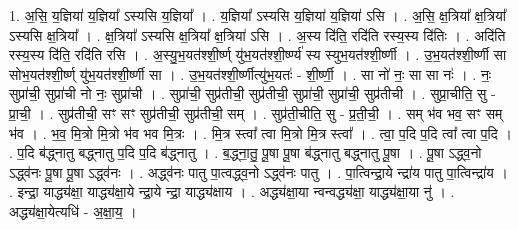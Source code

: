 \documentclass[17pt]{extarticle}
\begin{document}
1. अ॒सि॒ य॒ज्ञिया॑ य॒ज्ञिया᳚ ऽस्यसि य॒ज्ञिया᳚ । . य॒ज्ञिया᳚ ऽस्यसि य॒ज्ञिया॑ य॒ज्ञिया॑ ऽसि । . अ॒सि॒ क्ष॒त्रिया᳚ क्ष॒त्रिया᳚ ऽस्यसि क्ष॒त्रिया᳚ । . क्ष॒त्रिया᳚ ऽस्यसि क्ष॒त्रिया᳚ क्ष॒त्रिया॑ ऽसि । . अ॒स्य दि॑ति॒ रदि॑ति रस्य॒स्य दि॑तिः । . अदि॑ति रस्य॒स्य दि॑ति॒ रदि॑ति रसि । . अ॒स्यु॒भ॒यत॑श्शी॒र्ष्ण् यु॑भ॒यत॑श्शी॒र्ष्ण्य॑ स्य स्युभ॒यत॑श्शी॒र्ष्णी । . उ॒भ॒यत॑श्शी॒र्ष्णी सा सोभ॒यत॑श्शी॒र्ष्ण् यु॑भ॒यत॑श्शी॒र्ष्णी सा । . उ॒भ॒यत॑श्शी॒र्ष्णीत्यु॑भ॒यतः॑ - शी॒र्ष्णी॒ । . सा नो॑ नः॒ सा सा नः॑ । . नः॒ सुप्रा॑ची॒ सुप्रा॑ची नो नः॒ सुप्रा॑ची । . सुप्रा॑ची॒ सुप्र॑तीची॒ सुप्र॑तीची॒ सुप्रा॑ची॒ सुप्रा॑ची॒ सुप्र॑तीची । . सुप्रा॒चीति॒ सु - प्रा॒ची॒ । . सुप्र॑तीची॒ सꣳ सꣳ सुप्र॑तीची॒ सुप्र॑तीची॒ सम् । . सुप्र॑ती॒चीति॒ सु - प्र॒ती॒ची॒ । . सम् भ॑व भव॒ सꣳ सम् भ॑व । . भ॒व॒ मि॒त्रो मि॒त्रो भ॑व भव मि॒त्रः । . मि॒त्र स्त्वा᳚ त्वा मि॒त्रो मि॒त्र स्त्वा᳚ । . त्वा॒ प॒दि प॒दि त्वा᳚ त्वा प॒दि । . प॒दि ब॑द्ध्नातु बद्ध्नातु प॒दि प॒दि ब॑द्ध्नातु । . ब॒द्ध्ना॒तु॒ पू॒षा पू॒षा ब॑द्ध्नातु बद्ध्नातु पू॒षा । . पू॒षा ऽद्ध्व॒नो ऽद्ध्व॑नः पू॒षा पू॒षा ऽद्ध्व॑नः । . अद्ध्व॑नः पातु पा॒त्वद्ध्व॒नो ऽद्ध्व॑नः पातु । . पा॒त्विन्द्रा॒ये न्द्रा॑य पातु पा॒त्विन्द्रा॑य । . इन्द्रा॒ याद्ध्य॑क्षा॒ याद्ध्य॑क्षा॒ये न्द्रा॒ये न्द्रा॒ याद्ध्य॑क्षाय । . अद्ध्य॑क्षा॒या न्वन्वद्ध्य॑क्षा॒ याद्ध्य॑क्षा॒या नु॑ । . अद्ध्य॑क्षा॒येत्यधि॑ - अ॒क्षा॒य॒ । \newline
\end{document}
